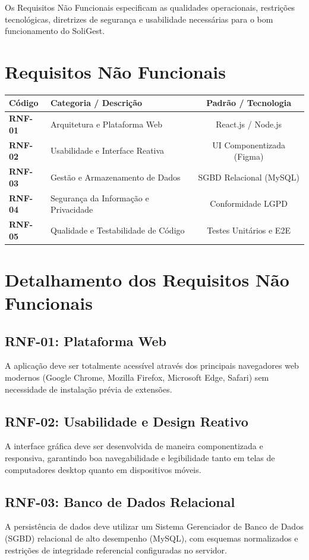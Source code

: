 \documentclass[
    12pt,               %
    a4paper,            %
    oneside,
    brazil              %
]{abntex2}
\begin{document}
Os Requisitos Não Funcionais especificam as qualidades operacionais, restrições tecnológicas, diretrizes de segurança e usabilidade necessárias para o bom funcionamento do SoliGest.

\section{Requisitos Não Funcionais}

\begin{tabularx}{\textwidth}{l X c}
\toprule
\textbf{Código} & \textbf{Categoria / Descrição} & \textbf{Padrão / Tecnologia} \\
\midrule
\textbf{RNF-01} & Arquitetura e Plataforma Web & React.js / Node.js \\
\textbf{RNF-02} & Usabilidade e Interface Reativa & UI Componentizada (Figma) \\
\textbf{RNF-03} & Gestão e Armazenamento de Dados & SGBD Relacional (MySQL) \\
\textbf{RNF-04} & Segurança da Informação e Privacidade & Conformidade LGPD \\
\textbf{RNF-05} & Qualidade e Testabilidade de Código & Testes Unitários e E2E \\
\bottomrule
\end{tabularx}

\section{Detalhamento dos Requisitos Não Funcionais}

\subsection{RNF-01: Plataforma Web}
A aplicação deve ser totalmente acessível através dos principais navegadores web modernos (Google Chrome, Mozilla Firefox, Microsoft Edge, Safari) sem necessidade de instalação prévia de extensões.

\subsection{RNF-02: Usabilidade e Design Reativo}
A interface gráfica deve ser desenvolvida de maneira componentizada e responsiva, garantindo boa navegabilidade e legibilidade tanto em telas de computadores desktop quanto em dispositivos móveis.

\subsection{RNF-03: Banco de Dados Relacional}
A persistência de dados deve utilizar um Sistema Gerenciador de Banco de Dados (SGBD) relacional de alto desempenho (MySQL), com esquemas normalizados e restrições de integridade referencial configuradas no servidor.
\end{document}
